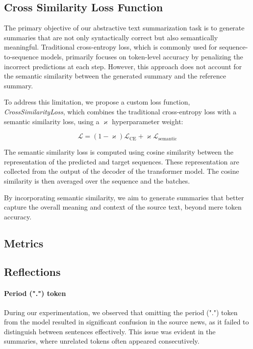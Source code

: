 \documentclass[a4paper, 11pt]{article}
\begin{document}
\subsection{Cross Similarity Loss Function}
The primary objective of our abstractive text summarization task is to generate summaries that are not only syntactically correct but also semantically meaningful. Traditional cross-entropy loss, which is commonly used for sequence-to-sequence models, primarily focuses on token-level accuracy by penalizing the incorrect predictions at each step. However, this approach does not account for the semantic similarity between the generated summary and the reference summary.

To address this limitation, we propose a custom loss function, \textit{CrossSimilarityLoss}, which combines the traditional cross-entropy loss\cite{CrossEnrtopyLoss} with a semantic similarity loss, using a $\varkappa$ hyperparameter weight:

\begin{equation}
    \mathcal{L} = (1 - \varkappa) \mathcal{L}_{\text{CE}} + \varkappa \mathcal{L}_{\text{semantic}}
\end{equation}

The semantic similarity loss is computed using cosine similarity\cite{cosineSimilarity} between the representation of the predicted and target sequences. These representation are collected from the output of the decoder of the transformer model. The cosine similarity is then averaged over the sequence and the batches.

By incorporating semantic similarity, we aim to generate summaries that better capture the overall meaning and context of the source text, beyond mere token accuracy.

\subsection{Metrics}

\subsection{Reflections}
\paragraph{Period (".") token}
During our experimentation, we observed that omitting the period (".") token from the model resulted in significant confusion in the source news, as it failed to distinguish between sentences effectively. This issue was evident in the summaries, where unrelated tokens often appeared consecutively.
\end{document}
